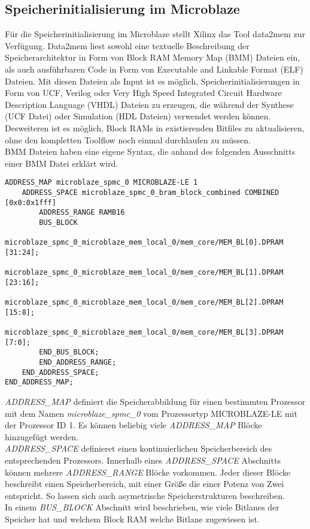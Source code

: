 \subsection{Speicherinitialisierung im Microblaze}
Für die Speicherinitialisierung im Microblaze stellt Xilinx das Tool data2mem zur Verfügung. %
Data2mem liest sowohl eine textuelle Beschreibung der Speicherarchitektur in Form von Block RAM Memory Map (BMM) Dateien ein, als auch ausführbaren Code in Form von Executable and Linkable Format (ELF) Dateien. Mit diesen Dateien als Input ist es möglich, Speicherinitialisierungen in Form von UCF, Verilog oder Very High Speed Integrated Circuit Hardware Description Language (VHDL) Dateien zu erzeugen, die während der Synthese (UCF Datei) oder Simulation (HDL Dateien) verwendet werden können. Desweiteren ist es möglich, Block RAMs in existierenden Bitfiles zu aktualisieren, ohne den kompletten Toolflow noch einmal durchlaufen zu müssen.\\
BMM Dateien haben eine eigene Syntax, die anhand des folgenden Ausschnitts einer BMM Datei erklärt wird.
\newpage
\begin{lstlisting}
ADDRESS_MAP microblaze_spmc_0 MICROBLAZE-LE 1
	ADDRESS_SPACE microblaze_spmc_0_bram_block_combined COMBINED [0x0:0x1fff]
		ADDRESS_RANGE RAMB16
		BUS_BLOCK
			microblaze_spmc_0_microblaze_mem_local_0/mem_core/MEM_BL[0].DPRAM [31:24];
			microblaze_spmc_0_microblaze_mem_local_0/mem_core/MEM_BL[1].DPRAM [23:16];
			microblaze_spmc_0_microblaze_mem_local_0/mem_core/MEM_BL[2].DPRAM [15:8];
			microblaze_spmc_0_microblaze_mem_local_0/mem_core/MEM_BL[3].DPRAM [7:0];
		END_BUS_BLOCK;
		END_ADDRESS_RANGE;
	END_ADDRESS_SPACE;
END_ADDRESS_MAP;
\end{lstlisting}
\textit{ADDRESS\_MAP} definiert die Speicherabbildung für einen bestimmten Prozessor mit dem Namen \textit{microblaze\_spmc\_0} vom Prozessortyp MICROBLAZE-LE mit der Prozessor ID 1. Es können beliebig viele \textit{ADDRESS\_MAP} Blöcke hinzugefügt werden.\\ \textit{ADDRESS\_SPACE} definieret einen kontinuierlichen Speicherbereich des entsprechenden Prozessors. Innerhalb eines \textit{ADDRESS\_SPACE} Abschnitts können mehrere \textit{ADDRESS\_RANGE} Blöcke vorkommen. Jeder dieser Blöcke beschreibt einen Speicherbereich, mit einer Größe die einer Potenz von Zwei entspricht. So lassen sich auch asymetrische Speicherstrukturen beschreiben.\\
In einem \textit{BUS\_BLOCK} Abschnitt wird beschrieben, wie viele Bitlanes der Speicher hat und welchem Block RAM welche Bitlane zugewiesen ist.

